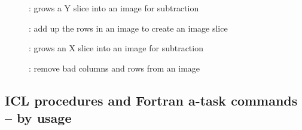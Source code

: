 \begin{description}
\item []: grows a Y slice into an image for subtraction

\item []: add up the rows in an image to create an
image slice

\item []: grows an X slice into an image for subtraction

\item []: remove bad columns and rows from an image

\end{description}


\newpage
\subsection{\label{ss:commands_by_usage}ICL procedures and Fortran a-task commands -- by usage}

